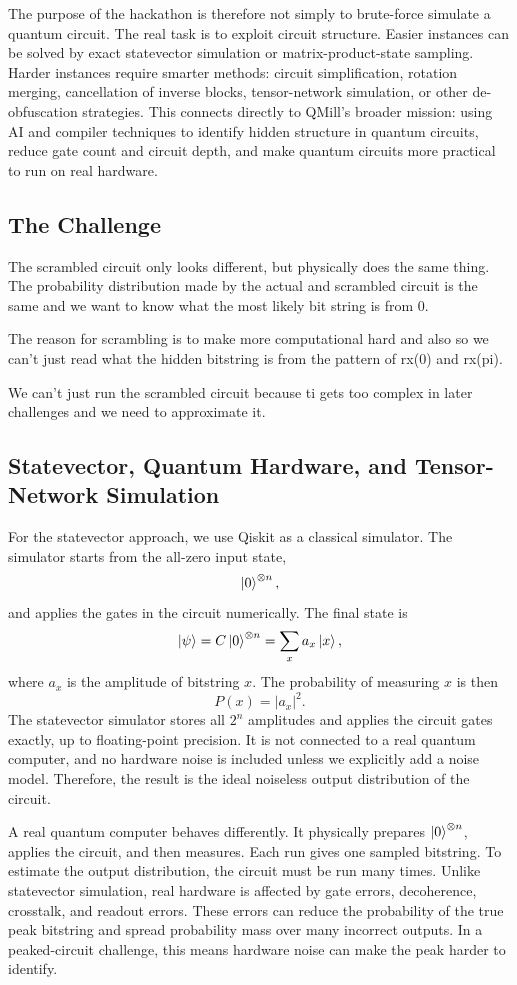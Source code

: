 The purpose of the hackathon is therefore not simply to brute-force simulate a
quantum circuit. The real task is to exploit circuit structure. Easier instances
can be solved by exact statevector simulation or matrix-product-state sampling.
Harder instances require smarter methods: circuit simplification, rotation
merging, cancellation of inverse blocks, tensor-network simulation, or other
de-obfuscation strategies. This connects directly to QMill's broader mission:
using AI and compiler techniques to identify hidden structure in quantum
circuits, reduce gate count and circuit depth, and make quantum circuits more
practical to run on real hardware.

\subsection{The Challenge}

The scrambled circuit only looks different, but physically does the same thing. The probability distribution made by the actual and scrambled circuit is the same and we want to know what the most likely bit string is from 0.

The reason for scrambling is to make more computational hard and also so we can't just read what the hidden bitstring is from the pattern of rx(0) and rx(pi).

We can't just run the scrambled circuit because ti gets too complex in later challenges and we need to approximate it.


\subsection{Statevector, Quantum Hardware, and Tensor-Network Simulation}

For the statevector approach, we use Qiskit as a classical simulator. The
simulator starts from the all-zero input state,
\[
\ket{0}^{\otimes n},
\]
and applies the gates in the circuit numerically. The final state is
\[
\ket{\psi} = C\ket{0}^{\otimes n}
= \sum_x a_x \ket{x},
\]
where \(a_x\) is the amplitude of bitstring \(x\). The probability of measuring
\(x\) is then
\[
P(x) = |a_x|^2.
\]
The statevector simulator stores all \(2^n\) amplitudes and applies the circuit
gates exactly, up to floating-point precision. It is not connected to a real
quantum computer, and no hardware noise is included unless we explicitly add a
noise model. Therefore, the result is the ideal noiseless output distribution of
the circuit.

A real quantum computer behaves differently. It physically prepares
\(\ket{0}^{\otimes n}\), applies the circuit, and then measures. Each run gives
one sampled bitstring. To estimate the output distribution, the circuit must be
run many times. Unlike statevector simulation, real hardware is affected by gate
errors, decoherence, crosstalk, and readout errors. These errors can reduce the
probability of the true peak bitstring and spread probability mass over many
incorrect outputs. In a peaked-circuit challenge, this means hardware noise can
make the peak harder to identify.

